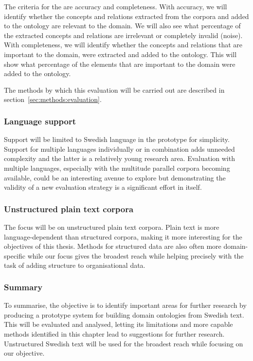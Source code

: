 \documentclass[a4paper]{report}
\begin{document}
The criteria for the are accuracy and completeness.
With accuracy, we will identify whether the concepts and relations extracted from the corpora and added to the ontology are relevant to the domain.
We will also see what percentage of the extracted concepts and relations are irrelevant or completely invalid (noise).
With completeness, we will identify whether the concepts and relations that are important to the domain, were extracted and added to the ontology.
This will show what percentage of the elements that are important to the domain were added to the ontology.

The methods by which this evaluation will be carried out are described in section~\ref{sec:methods:evaluation}.

\subsubsection{Language support}

Support will be limited to Swedish language in the prototype for simplicity.
Support for multiple languages individually or in combination adds unneeded complexity and the latter is a relatively young research area.
Evaluation with multiple languages, especially with the multitude parallel corpora becoming available, could be an interesting avenue to explore but demonstrating the validity of a new evaluation strategy is a significant effort in itself.

\subsubsection{Unstructured plain text corpora}

The focus will be on unstructured plain text corpora.
Plain text is more language-dependent than structured corpora, making it more interesting for the objectives of this thesis.
Methods for structured data are also often more domain-specific while our focus gives the broadest reach while helping precisely with the task of adding structure to organisational data.

\subsubsection{Summary}

To summarise, the objective is to identify important areas for further research by producing a prototype system for building domain ontologies from Swedish text.
This will be evaluated and analysed, letting its limitations and more capable methods identified in this chapter lead to suggestions for further research.
Unstructured Swedish text will be used for the broadest reach while focusing on our objective.
\end{document}
